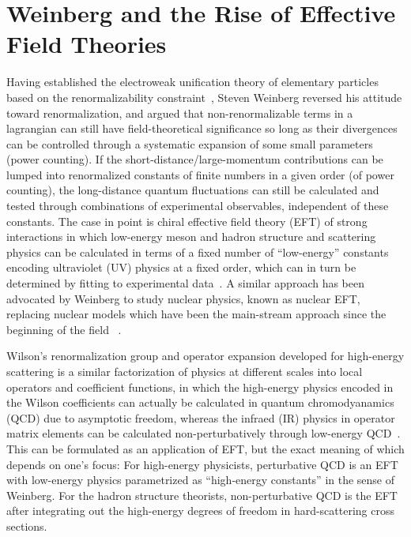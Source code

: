 \documentclass[prd,aps,twocolumn,preprintnumbers,showpacs,nofootinbib,superscriptaddress,notitlepage]{revtex4-1}
\begin{document}
\section{Weinberg and the Rise of Effective Field Theories}
Having established the electroweak unification theory of elementary particles based on the renormalizability constraint~\cite{Weinberg:1967tq}, Steven Weinberg reversed his attitude toward renormalization, and argued that non-renormalizable terms in a lagrangian can still have field-theoretical significance so long as their divergences can be controlled through a systematic expansion of some small parameters (power counting). If the short-distance/large-momentum contributions can be lumped into renormalized constants of finite numbers in a given order (of power counting), the long-distance quantum fluctuations can still be calculated and tested through combinations of experimental observables, independent of these constants. The case in point is chiral effective field theory (EFT) of strong interactions in which low-energy meson and hadron structure and scattering physics can be calculated in terms of a fixed number of ``low-energy'' constants encoding ultraviolet (UV) physics at a fixed order, which can in turn be determined by fitting to experimental data~\cite{Weinberg:1968de,Weinberg:1978kz,
Gasser:1983yg}. A similar approach has been advocated by Weinberg to study nuclear physics, known as nuclear EFT, replacing nuclear models which have been the main-stream approach since the beginning of the field
~\cite{Weinberg:1990rz,Weinberg:1991um,
Kaplan:1996xu,Epelbaum:2008ga}.  

Wilson's renormalization group and operator expansion developed  for high-energy scattering is a similar factorization of physics at different scales into local operators and coefficient functions, in which the high-energy physics encoded in the Wilson coefficients can actually be calculated in quantum chromodyanamics (QCD) due to asymptotic freedom, whereas the infraed (IR) physics in operator matrix elements can be calculated non-perturbatively through low-energy QCD~\cite{Wilson:1969zs,Christ:1972ms}. This can be formulated as an application of EFT, but the exact meaning of which depends on one's focus: For high-energy physicists, perturbative QCD is an EFT with low-energy physics parametrized as ``high-energy constants'' in the sense of Weinberg. For the hadron structure theorists, non-perturbative QCD is the EFT after integrating out the high-energy degrees of freedom in hard-scattering cross sections.
\end{document}
